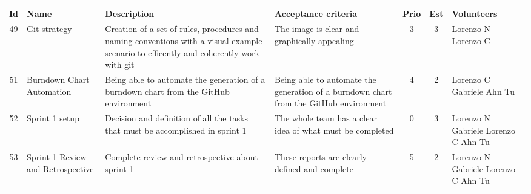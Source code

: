 \newpage
\begin{tabular}{|c|m{1.5cm}|m{4cm}|m{2.5cm}|c|c|m{1.8cm}|}
	\hline	     \textbf{Id}&\textbf{Name}&\textbf{Description}&\textbf{Acceptance criteria}&\textbf{Prio}&\textbf{Est}&\textbf{Volunteers}\\
	\hline
	49 & Git strategy & 
	Creation of a set of rules, procedures and naming conventions with a visual example scenario to efficently and coherently work with git & 
	The image is clear and graphically appealing &
	3 & 3 & 
	Lorenzo N Lorenzo C \\
	
	\hline
	51 & Burndown Chart Automation & 
	Being able to automate the generation of a burndown chart from the GitHub environment & 
	Being able to automate the generation of a burndown chart from the GitHub environment &
	4 & 2 & 
	Lorenzo C Gabriele Ahn Tu \\
	\hline
	
	\hline
	52 & Sprint 1 setup & 
	Decision and definition of all the tasks that must be accomplished in sprint 1 & 
	The whole team has a clear idea of what must be completed &
	0 & 3 & 
	Lorenzo N Gabriele Lorenzo C Ahn Tu \\
	
	\hline
	53 & Sprint 1 Review and Retrospective & 
	Complete review and retrospective about sprint 1 & 
	These reports are clearly defined and complete &
	5 & 2 & 
	Lorenzo N Gabriele Lorenzo C Ahn Tu \\
	\hline
\end{tabular}
